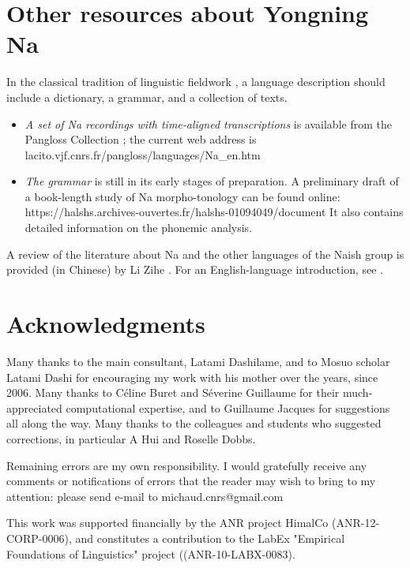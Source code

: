 \documentclass[oldfontcommands,oneside,a4paper,11pt]{article}
\begin{document}
	\section{Other resources about Yongning Na} \label{sec:resources}
	
	In the classical tradition of linguistic fieldwork \citep{Dixon2007}, a language description should include a dictionary, a grammar, and a collection of texts. 
	
	\begin{itemize}
		\item \textit{A set of Na recordings with time-aligned transcriptions} is available from the Pangloss Collection \citep{Michailovsky2014}; the current web address is lacito.vjf.cnrs.fr/pangloss/languages/Na\_en.htm 
		\item \textit{The grammar} is still in its early stages of preparation. A preliminary draft of a book-length study of Na morpho-tonology can be found online: https://halshs.archives-ouvertes.fr/halshs-01094049/document It also contains detailed information on the phonemic analysis.
	\end{itemize}
	
	A review of the literature about Na and the other languages of the Naish  group is provided (in Chinese) by Li Zihe \citet{李子鹤2015}. For an English-language introduction, see \citet{Michaud2015b}.
	
	
	\section{Acknowledgments} \label{sec:ackno}
	
	Many thanks to the main consultant, Latami Dashilame, and to Mosuo scholar Latami Dashi for encouraging my work with his mother over the years, since 2006. Many thanks to Céline Buret and Séverine Guillaume for their much-appreciated computational expertise, and to Guillaume Jacques for suggestions all along the way. Many thanks to the colleagues and students who suggested corrections, in particular A Hui and Roselle Dobbs.
	
	Remaining errors are my own responsibility. I would gratefully receive any comments or notifications of errors that the reader may wish to bring to my attention: please send e-mail to michaud.cnrs@gmail.com 
	
	This work was supported financially by the ANR project HimalCo (ANR-12-CORP-0006), and constitutes a contribution to the LabEx "Empirical Foundations of Linguistics" project ((ANR-10-LABX-0083).




\end{document}
